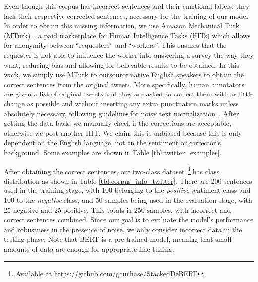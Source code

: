 \documentclass[review]{elsarticle}
\begin{document}
Even though this corpus has incorrect sentences and their emotional labels, they lack their respective corrected sentences, necessary for the training of our model. In order to obtain this missing information, we use Amazon Mechanical Turk (MTurk)~\cite{buhrmester2011amazon}, a paid marketplace for Human Intelligence Tasks (HITs) which allows for anonymity between ``requesters” and ``workers”. This ensures that the requester is not able to influence the worker into answering a survey the way they want, reducing bias and allowing for believable results to be obtained. In this work, we simply use MTurk to outsource native English speakers to obtain the correct sentences from the original tweets. More specifically, human annotators are given a list of original tweets and they are asked to correct them with as little change as possible and without inserting any extra punctuation marks unless absolutely necessary, following guidelines for noisy text normalization~\cite{lourentzou2019adapting}. After getting the data back, we manually check if the corrections are acceptable, otherwise we post another HIT. We claim this is unbiased because this is only dependent on the English language, not on the sentiment or corrector's background. Some examples are shown in Table \ref{tbl:twitter_examples}.

\begin{table}[ht!]
  \caption{Examples of original tweets and their corrected version.}
  \label{tbl:twitter_examples}
  \bigskip
  \centering
\end{table}

After obtaining the correct sentences, our two-class dataset~\footnote{Available at \url{https://github.com/gcunhase/StackedDeBERT}} has class distribution as shown in Table \ref{tbl:corpus_info_twitter}. There are 200 sentences used in the training stage, with 100 belonging to the \textit{positive} sentiment class and 100 to the \textit{negative} class, and 50 samples being used in the evaluation stage, with 25 negative and 25 positive. This totals in 250 samples, with incorrect and correct sentences combined. Since our goal is to evaluate the model's performance and robustness in the presence of noise, we only consider incorrect data in the testing phase. Note that BERT is a pre-trained model, meaning that small amounts of data are enough for appropriate fine-tuning.
\end{document}
